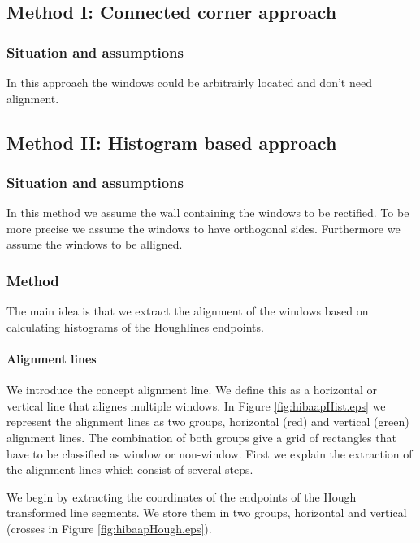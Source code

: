 \subsection{Method I: Connected corner approach} 
\subsubsection{Situation and assumptions}
In this approach the windows could be arbitrairly located and don't need
alignment.

\subsection{Method II: Histogram based approach} 
\subsubsection{Situation and assumptions}
In this method we assume the wall containing the windows to be rectified.
To be more precise we assume the windows to have orthogonal sides.
Furthermore we assume the windows to be alligned.

\subsubsection{Method}
The main idea is that we extract the alignment of the windows based on
calculating histograms of the Houghlines endpoints.

\paragraph{Alignment lines}
We introduce the concept alignment line. We define this as a horizontal or
vertical line that alignes multiple windows. In Figure
\ref{fig:hibaapHist.eps}
we represent the alignment lines as two groups, horizontal (red) and
vertical (green) alignment lines.  The combination of both groups give a grid of
rectangles that have to be classified as window or non-window.
First we explain the extraction of the alignment lines which consist of several
steps.

We begin by extracting the coordinates of the endpoints of the Hough transformed line
segments. We store them in two groups, horizontal and vertical (crosses in Figure
\ref{fig:hibaapHough.eps}). 


